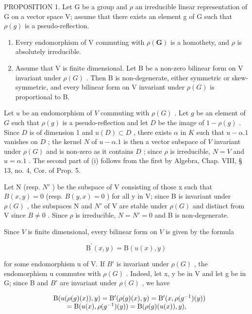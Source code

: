PROPOSITION 1. Let G be a group and \(\rho\) an irreducible linear representation of G on a vector space V; assume that there exists an element g of G such that \(\rho(g)\) is a pseudo-reflection.

\begin{enumerate}
\def\labelenumi{(\roman{enumi})}
\item
  Every endomorphism of V commuting with \(\rho(\mathbf{G})\) is a homothety, and \(\rho\) is absolutely irreducible.
\item
  Assume that V is finite dimensional. Let B be a non-zero bilinear form on V invariant under \(\rho(G)\) . Then B is non-degenerate, either symmetric or skew-symmetric, and every bilinear form on V invariant under \(\rho(G)\) is proportional to B.
\end{enumerate}

Let \(u\) be an endomorphism of \(V\) commuting with \(\rho(G)\) . Let \(g\) be an element of \(G\) such that \(\rho(g)\) is a pseudo-reflection and let \(D\) be the image of \(1 - \rho(g)\) . Since \(D\) is of dimension 1 and \(u(D) \subset D\) , there exists \(\alpha\) in \(K\) such that \(u - \alpha.1\) vanishes on \(D\) ; the kernel \(N\) of \(u - \alpha.1\) is then a vector subspace of \(V\) invariant under \(\rho(G)\) and is non-zero as it contains \(D\) ; since \(\rho\) is irreducible, \(N = V\) and \(u = \alpha.1\) . The second part of (i) follows from the first by Algebra, Chap. VIII, § 13, no. 4, Cor. of Prop. 5.

Let N (resp. \(N'\) ) be the subspace of V consisting of those x such that \(B(x,y)=0\) (resp. \(B(y,x)=0\) ) for all y in V; since B is invariant under \(\rho(G)\) , the subspaces N and \(N'\) of V are stable under \(\rho(G)\) and distinct from V since \(B\neq0\) . Since \(\rho\) is irreducible, \(N=N'=0\) and B is non-degenerate.

Since \(V\) is finite dimensional, every bilinear form on \(V\) is given by the formula

\[
\mathrm{B} ^ {\prime} (x, y) = \mathrm{B} (u (x), y)\tag{3}
\]

for some endomorphism u of V. If \(B'\) is invariant under \(\rho(G)\) , the endomorphism u commutes with \(\rho(G)\) . Indeed, let x, y be in V and let g be in G; since B and \(B'\) are invariant under \(\rho(G)\) , we have

\[
\begin{array}{r l} & {\mathrm{B} (u (\rho (g) (x)), y) = \mathrm{B} ^ {\prime} (\rho (g) (x), y) = \mathrm{B} ^ {\prime} (x, \rho (g ^ {- 1}) (y))} \\ & {\qquad = \mathrm{B} (u (x), \rho (g ^ {- 1}) (y)) = \mathrm{B} (\rho (g) (u (x)), y),} \end{array}
\]

